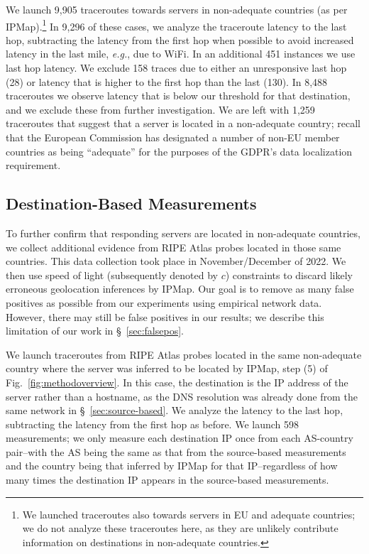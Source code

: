 We launch 9,905 traceroutes towards servers in non-adequate countries (as per IPMap).\footnote{We launched 
traceroutes also towards servers in EU and adequate countries; we do not analyze these traceroutes here,
as they are unlikely contribute information on destinations in non-adequate countries.} 
In 9,296 of these cases, we analyze the traceroute latency to the last hop, 
subtracting the latency from the first hop
when possible to avoid increased latency in the last mile, \textit{e.g.}, due to WiFi.
In an additional 451 instances we use last hop latency. 
We exclude 158 traces due to either an unresponsive last hop 
(28) or latency that is higher to the first hop than the last (130).
In 8,488 traceroutes we observe latency that is below our threshold for that destination,
and we exclude these from further investigation. We are left with 1,259 traceroutes
that suggest that a server is located in a non-adequate country;
recall that the European Commission has designated a number of
non-EU member countries as being ``adequate'' for the purposes of
the GDPR's data localization requirement.~\cite{Adequacy38:online}


\subsection{Destination-Based Measurements}
\label{sec:destination-based}
To further confirm that responding servers are located in non-adequate countries, we 
collect additional evidence from RIPE Atlas probes located in those same countries.
This data collection took place in November/December of 2022.
We then use speed of light (subsequently denoted by $c$) constraints to 
discard likely erroneous geolocation inferences by IPMap.
Our goal is to remove as many false positives as possible from our experiments using empirical network data. 
However, there may still be false positives in our results; 
we describe this limitation of our work in \S~\ref{sec:falsepos}.

We launch traceroutes from RIPE Atlas probes located in the same non-adequate country
where the server was inferred to be located by IPMap, step (5) of Fig.~\ref{fig:methodoverview}. In this case, the
destination is the IP address of the server rather than a hostname,
as the DNS resolution was already done from the same network in \S~\ref{sec:source-based}.
We analyze the latency to the last hop, subtracting the latency from the first hop
as before.
We launch 598 measurements; we only measure each destination IP
once from each AS-country pair--with the AS being the 
same as that from the source-based measurements and the country 
being that inferred by IPMap for that IP--regardless of how many times the destination IP 
appears in the source-based measurements. 

